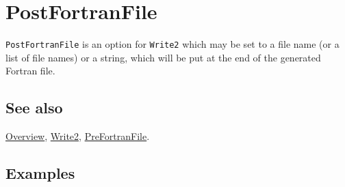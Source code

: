 \documentclass[../FeynCalcManual.tex]{subfiles}
\begin{document}
\hypertarget{postfortranfile}{
\section{PostFortranFile}\label{postfortranfile}}

\texttt{PostFortranFile} is an option for \texttt{Write2} which may be
set to a file name (or a list of file names) or a string, which will be
put at the end of the generated Fortran file.

\subsection{See also}

\hyperlink{toc}{Overview}, \hyperlink{write2}{Write2},
\hyperlink{prefortranfile}{PreFortranFile}.

\subsection{Examples}
\end{document}

